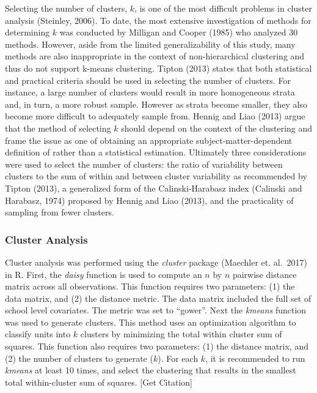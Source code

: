 \documentclass[man,floatsintext]{apa6}
\begin{document}
Selecting the number of clusters, \(k\), is one of the most difficult problems in cluster analysis (Steinley, 2006). To date, the most extensive investigation of methods for determining \(k\) was conducted by Milligan and Cooper (1985) who analyzed 30 methods. However, aside from the limited generalizability of this study, many methods are also inappropriate in the context of non-hierarchical clustering and thus do not support k-means clustering. Tipton (2013) states that both statistical and practical criteria should be used in selecting the number of clusters. For instance, a large number of clusters would result in more homogeneous strata and, in turn, a more robust sample. However as strata become smaller, they also become more difficult to adequately sample from. Hennig and Liao (2013) argue that the method of selecting \(k\) should depend on the context of the clustering and frame the issue as one of obtaining an appropriate subject-matter-dependent definition of rather than a statistical estimation. Ultimately three considerations were used to select the number of clusters: the ratio of variability between clusters to the sum of within and between cluster variability as recommended by Tipton (2013), a generalized form of the Calinski-Harabasz index (Calinski and Harabasz, 1974) proposed by Hennig and Liao (2013), and the practicality of sampling from fewer clusters.

\hypertarget{cluster-analysis}{%
\subsubsection{Cluster Analysis}\label{cluster-analysis}}

Cluster analysis was performed using the \emph{cluster} package (Maechler et. al.~2017) in R. First, the \emph{daisy} function is used to compute an \(n\) by \(n\) pairwise distance matrix across all observations. This function requires two parameters: (1) the data matrix, and (2) the distance metric. The data matrix included the full set of school level covariates. The metric was set to \enquote{gower}. Next the \emph{kmeans} function was used to generate clusters. This method uses an optimization algorithm to classify units into \(k\) clusters by minimizing the total within cluster sum of squares. This function also requires two parameters: (1) the distance matrix, and (2) the number of clusters to generate (\(k\)). For each \(k\), it is recommended to run \emph{kmeans} at least 10 times, and select the clustering that results in the smallest total within-cluster sum of squares. {[}Get Citation{]}
\end{document}
